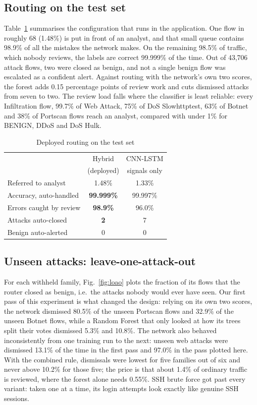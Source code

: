\documentclass[conference]{IEEEtran}
\begin{document}
\subsection{Routing on the test set}
Table~\ref{tab:routing} summarises the configuration that runs in the application. One flow in
roughly 68 (1.48\%) is put in front of an analyst, and that small queue contains 98.9\% of all the
mistakes the network makes. On the remaining 98.5\% of traffic, which nobody reviews, the labels
are correct 99.999\% of the time. Out of 43,706 attack flows, two were closed as benign, and not a
single benign flow was escalated as a confident alert. Against routing with the network's own two
scores, the forest adds 0.15 percentage points of review work and cuts dismissed attacks from seven
to two. The review load falls where the classifier is least reliable: every Infiltration flow,
99.7\% of Web Attack, 75\% of DoS Slowhttptest, 63\% of Botnet and 38\% of Portscan flows reach an
analyst, compared with under 1\% for BENIGN, DDoS and DoS Hulk.

\begin{table}[t]
\caption{Deployed routing on the test set}
\label{tab:routing}
\centering
\footnotesize
\begin{tabular}{lcc}
\toprule
 & Hybrid & CNN-LSTM \\
 & (deployed) & signals only \\
\midrule
Referred to analyst & 1.48\% & 1.33\% \\
Accuracy, auto-handled & \textbf{99.999\%} & 99.997\% \\
Errors caught by review & \textbf{98.9\%} & 96.0\% \\
Attacks auto-closed & \textbf{2} & 7 \\
Benign auto-alerted & 0 & 0 \\
\bottomrule
\end{tabular}
\end{table}

\subsection{Unseen attacks: leave-one-attack-out}
\label{sec:loao}
For each withheld family, Fig.~\ref{fig:loao} plots the fraction of its flows that the router
closed as benign, i.e.\ the attacks nobody would ever have seen. Our first pass of this experiment
is what changed the design: relying on its own two scores, the network dismissed 80.5\% of the
unseen Portscan flows and 32.9\% of the unseen Botnet flows, while a Random Forest that only looked
at how its trees split their votes dismissed 5.3\% and 10.8\%. The network also behaved
inconsistently from one training run to the next: unseen web attacks were dismissed 13.1\% of the
time in the first pass and 97.0\% in the pass plotted here. With the combined rule, dismissals
were lowest for five families out of six and never above 10.2\% for those five; the price is that
about 1.4\% of ordinary traffic is reviewed, where the forest alone needs 0.55\%. SSH brute force
got past every variant: taken one at a time, its login attempts look exactly like genuine SSH
sessions.
\end{document}
